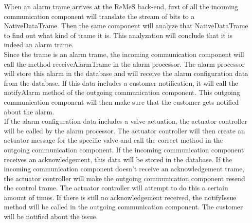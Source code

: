 
When an alarm trame arrives at the ReMeS back-end, first of all the incoming communication component will translate
	the stream of bits to a NativeDataTrame. Then the same component will analyze that NativeDataTrame to find out
	what kind of trame it is. This analyzation will conclude that it is indeed an alarm trame.\\
Since the trame is an alarm trame, the incoming communication component will call the method receiveAlarmTrame in the
	alarm processor. The alarm processor will store this alarm in the database and will receive the alarm configuration
	data from the database. If this data includes a customer notification, it will call the notifyAlarm method of the
	outgoing communication component. This outgoing communication component will then make sure that the customer gets
	notified about the alarm.\\
If the alarm configuration data includes a valve actuation, the actuator controller will be called by the alarm processor.
	The actuator controller will then create an actuator message for the specific valve and call the correct method in the
	outgoing communication component. If the incoming communication component receives an acknowledgement, this data will be
	stored in the database. If the incoming communication component doesn't receive an acknowledgement trame, the actuator controller
	will make the outgoing communication component resend the control trame. The actuator controller will attempt to do this
	a certain amount of times. If there is still no acknowledgement received, the notifyIssue method will be called in the
	outgoing communication component. The customer will be notified about the issue.
